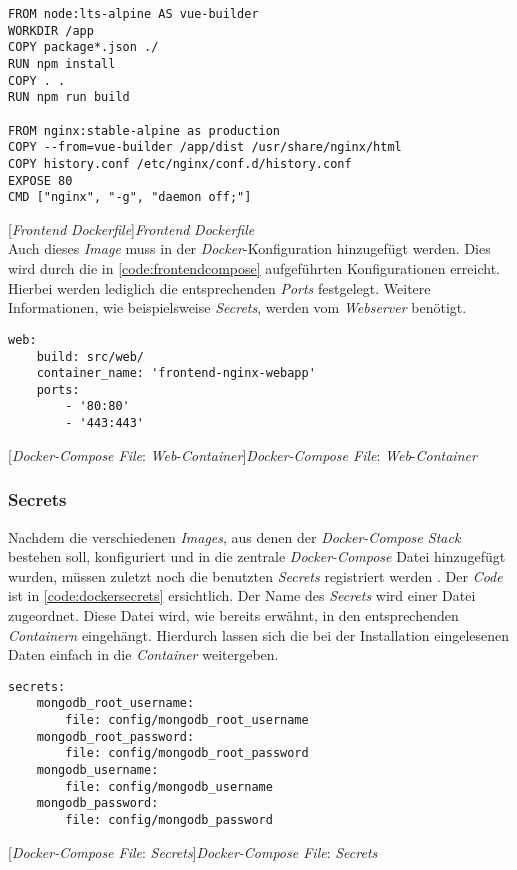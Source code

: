 \begin{verbatim}
FROM node:lts-alpine AS vue-builder
WORKDIR /app
COPY package*.json ./
RUN npm install
COPY . .
RUN npm run build
	
FROM nginx:stable-alpine as production
COPY --from=vue-builder /app/dist /usr/share/nginx/html
COPY history.conf /etc/nginx/conf.d/history.conf
EXPOSE 80
CMD ["nginx", "-g", "daemon off;"]
\end{verbatim}
[\textit{Frontend} \textit{Dockerfile}]{\textit{Frontend} \textit{Dockerfile}}
\label{code:dockerfrontend}
~\\
Auch dieses \textit{Image} muss in der \textit{Docker}-Konfiguration hinzugefügt werden. Dies wird durch die in \autoref{code:frontendcompose} aufgeführten Konfigurationen erreicht. Hierbei werden lediglich die entsprechenden \textit{Ports} festgelegt. Weitere Informationen, wie beispielsweise \textit{Secrets}, werden vom \textit{Webserver} benötigt.

\begin{verbatim}
web:
	build: src/web/
	container_name: 'frontend-nginx-webapp'
	ports:
		- '80:80'
		- '443:443'
\end{verbatim}
[\textit{Docker-Compose File}: \textit{Web}-\textit{Container}]{\textit{Docker-Compose File}: \textit{Web}-\textit{Container}}
\label{code:frontendcompose}

\newpage

\subsubsection{Secrets}

Nachdem die verschiedenen \textit{Images}, aus denen der \textit{Docker-Compose Stack} bestehen soll, konfiguriert und in die zentrale \textit{Docker-Compose} Datei hinzugefügt wurden, müssen zuletzt noch die benutzten \textit{Secrets} registriert werden \cite{secretmongo}. Der \textit{Code} ist in \autoref{code:dockersecrets} ersichtlich. Der Name des \textit{Secrets} wird einer Datei zugeordnet. Diese Datei wird, wie bereits erwähnt, in den entsprechenden \textit{Containern} eingehängt. Hierdurch lassen sich die bei der Installation eingelesenen Daten einfach in die \textit{Container} weitergeben.

\begin{verbatim}
secrets:
	mongodb_root_username:
		file: config/mongodb_root_username
	mongodb_root_password:
		file: config/mongodb_root_password
	mongodb_username:
		file: config/mongodb_username
	mongodb_password:
		file: config/mongodb_password
\end{verbatim}
[\textit{Docker-Compose File}: \textit{Secrets}]{\textit{Docker-Compose File}: \textit{Secrets}}
\label{code:dockersecrets}

